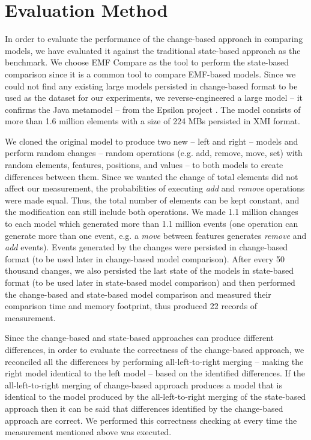 \documentclass{jot}
\begin{document}
\section{Evaluation Method}
\label{sec:evaluation}

In order to evaluate the performance of the change-based approach in comparing models, we have evaluated it against the traditional state-based approach as the benchmark. We choose EMF Compare \cite{emfcompare2018developer,eclipse2017compare} as the tool to perform the state-based comparison since it is a common tool to compare EMF-based models. Since we could not find any existing large models persisted in change-based format to be used as the dataset for our experiments, we reverse-engineered a large model -- it confirms the Java metamodel \cite{eclipse2018modiscojava} -- from the Epsilon project \cite{eclipse2018epsilongit,eclipse2017epsilon}. The model consists of more than 1.6 million elements with a size of 224 MBs persisted in XMI format. 

We cloned the original model to produce two new -- left and right -- models and perform random changes -- random operations (e.g. add, remove, move, set) with random elements, features, positions, and values -- to both models to create differences between them. Since we wanted the change of total elements did not affect our measurement, the probabilities of executing \textit{add} and \textit{remove} operations were made equal. Thus, the total number of elements can be kept constant, and the modification can still include both operations. We made 1.1 million changes to each model which generated more than 1.1 million events (one operation can generate more than one event, e.g. a \textit{move} between features generates \textit{remove} and \textit{add} events). Events generated by the changes were persisted in change-based format (to be used later in change-based model comparison). After every 50 thousand changes, we also persisted the last state of the models in state-based format (to be used later in state-based model comparison) and then performed the change-based and state-based model comparison and measured their comparison time and memory footprint, thus produced 22 records of measurement. 

Since the change-based and state-based approaches can produce different differences, in order to evaluate the correctness of the change-based approach, we reconciled all the differences by performing all-left-to-right merging -- making the right model identical to the left model -- based on the identified differences. If the all-left-to-right merging of change-based approach produces a model that is identical to the model produced by the all-left-to-right merging of the state-based approach then it can be said that differences identified by the change-based approach are correct. We performed this correctness checking at every time the measurement mentioned above was executed.
\end{document}
